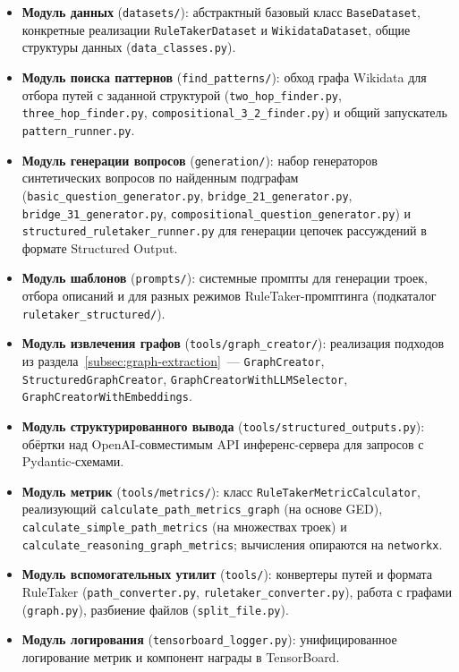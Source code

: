 \begin{itemize}
    \setlength{\itemsep}{\smallskipamount}
    \item \textbf{Модуль данных} (\texttt{datasets/}): абстрактный базовый класс \texttt{BaseDataset}, конкретные реализации \texttt{RuleTakerDataset} и \texttt{WikidataDataset}, общие структуры данных (\texttt{data\_classes.py}).
    \item \textbf{Модуль поиска паттернов} (\texttt{find\_patterns/}): обход графа Wikidata для отбора путей с заданной структурой (\texttt{two\_hop\_finder.py}, \texttt{three\_hop\_finder.py}, \texttt{compositional\_3\_2\_finder.py}) и общий запускатель \texttt{pattern\_runner.py}.
    \item \textbf{Модуль генерации вопросов} (\texttt{generation/}): набор генераторов синтетических вопросов по найденным подграфам (\texttt{basic\_question\_generator.py}, \texttt{bridge\_21\_generator.py}, \texttt{bridge\_31\_generator.py}, \texttt{compositional\_question\_generator.py}) и \texttt{structured\_ruletaker\_runner.py} для генерации цепочек рассуждений в формате Structured Output.
    \item \textbf{Модуль шаблонов} (\texttt{prompts/}): системные промпты для генерации троек, отбора описаний и для разных режимов RuleTaker-промптинга (подкаталог \texttt{ruletaker\_structured/}).
    \item \textbf{Модуль извлечения графов} (\texttt{tools/graph\_creator/}): реализация подходов из раздела~\ref{subsec:graph-extraction}~--- \texttt{GraphCreator}, \texttt{Structured\allowbreak GraphCreator}, \texttt{GraphCreatorWith\allowbreak LLMSelector}, \texttt{GraphCreatorWith\allowbreak Embeddings}.
    \item \textbf{Модуль структурированного вывода} (\texttt{tools/structured\_outputs.py}): обёртки над OpenAI-совместимым API инференс-сервера для запросов с Pydantic-схемами.
    \item \textbf{Модуль метрик} (\texttt{tools/metrics/}): класс \texttt{RuleTakerMetricCalculator}, реализующий \texttt{calculate\_path\_metrics\_graph} (на основе GED), \texttt{calculate\_simple\_path\_metrics} (на множествах троек) и \texttt{calculate\_reasoning\_graph\_metrics}; вычисления опираются на \texttt{networkx}.
    \item \textbf{Модуль вспомогательных утилит} (\texttt{tools/}): конвертеры путей и формата RuleTaker (\texttt{path\_converter.py}, \texttt{ruletaker\_converter.py}), работа с графами (\texttt{graph.py}), разбиение файлов (\texttt{split\_file.py}).
    \item \textbf{Модуль логирования} (\texttt{tensorboard\_logger.py}): унифицированное логирование метрик и компонент награды в TensorBoard.
\end{itemize}

